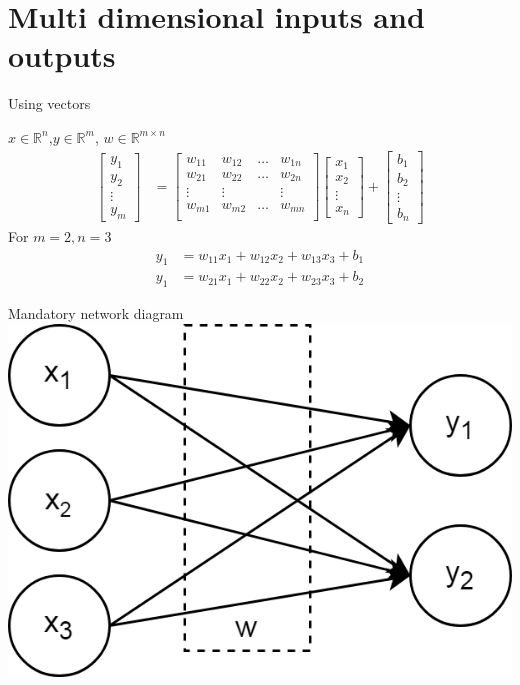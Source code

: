 \section{Multi dimensional inputs and outputs}
\begin{frame}{Using vectors}

		\begin{block}{$x \in \mathbb{R}^n$,$y \in \mathbb{R}^m$, $w\in \mathbb{R}^{m \times n}$}
			\begin{align*}
				\begin{bmatrix}
					y_1 \\
					y_2 \\
					\vdots \\
					y_m
				\end{bmatrix} & =  
				\begin{bmatrix}
					w_{11} & w_{12}& \dots & w_{1n}  \\
					w_{21} & w_{22}& \dots & w_{2n}  \\
					\vdots &\vdots &  & \vdots  \\
					w_{m1} & w_{m2}& \dots & w_{mn}  \\
				\end{bmatrix}
			\begin{bmatrix}
				x_1 \\
				x_2 \\
				\vdots \\
				x_n
			\end{bmatrix} + 
			\begin{bmatrix}
			b_1 \\
			b_2 \\
			\vdots \\
			b_n
			\end{bmatrix}
			\end{align*}
		For $m=2, n=3$
		\begin{align*}
		y_1 &= w_{11}x_1 + w_{12}x_2+w_{13}x_3 + b_1 \\
		y_1 &= w_{21}x_1 + w_{22}x_2+w_{23}x_3 + b_2 
		\end{align*}
		\end{block}
\end{frame}
\begin{frame}{Mandatory network diagram}
	\includegraphics[width=.6\textwidth, center]{figuras/fully_connected_0_layer.png}	
\end{frame}
